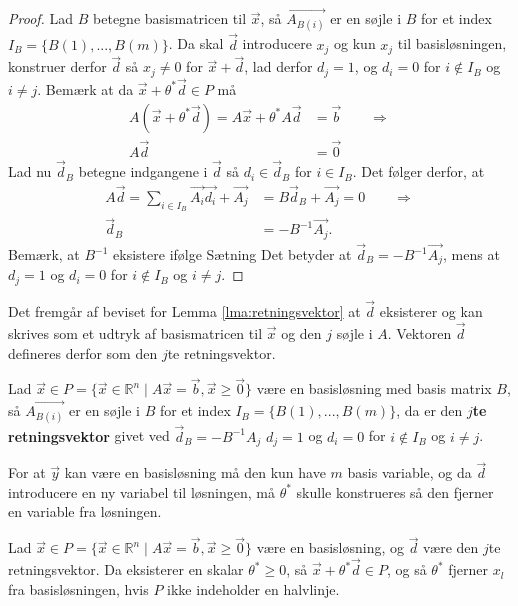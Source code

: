 \begin{proof}
Lad $B$ betegne basismatricen til $\vec{x}$, så $\vec{A_{B(i)}}$ er en søjle i $B$ for et index $I_B =\{B(1),...,B(m)\}$. 
Da skal $\vec{d}$ introducere $x_j$ og kun $x_j$ til basisløsningen, konstruer derfor $\vec{d}$ så $x_j \neq 0$ for $\vec{x}+\vec{d}$, lad derfor $d_j=1$, og $d_i = 0$ for $i\notin I_B$ og $i \neq j$. 
Bemærk at da $\vec{x}+ \theta^*\vec{d} \in P$ må
\begin{align*}
	A(\vec{x}+\theta^* \vec{d}) = A\vec{x} + \theta^* A \vec{d}  & = \vec{b} \qquad \Rightarrow
	\\ A \vec{d} &= \vec{0}
\end{align*}
Lad nu $\vec{d}_B$ betegne indgangene i $\vec{d}$ så $d_i \in \vec{d}_B$ for $i \in I_B$. 
Det følger derfor, at
\begin{align*}
A \vec{d} = \sum_{i \in I_B} \vec{A_i} \vec{d_i} + \vec{A_j} &= B\vec{d}_B + \vec{A_j} = 0 \qquad \Rightarrow
\\ \vec{d}_B &= -B^{-1}\vec{A_j}.
\end{align*}
Bemærk, at $B^{-1}$ eksistere ifølge Sætning %
Det betyder at $\vec{d}_B = -B^{-1}\vec{A_j}$, mens at $d_j = 1$ og $d_i = 0$ for $i\notin I_B$ og $i \neq j$.
\end{proof}
Det fremgår af beviset for Lemma \ref{lma:retningsvektor} at $\vec{d}$ eksisterer og kan skrives som et udtryk af basismatricen til $\vec{x}$ og den $j$ søjle i $A$. 
Vektoren $\vec{d}$ defineres derfor som den $j$te retningsvektor. 
\begin{defn}[$j$te retningsvektor]
Lad $\vec{x} \in P =\{\vec{x}\in \mathds{R}^n \mid A\vec{x}= \vec{b}, \vec{x}\geq \vec{0}\}$ være en basisløsning med basis matrix $B$, så $\vec{A_{B(i)}}$ er en søjle i $B$ for et index $I_B =\{B(1),...,B(m)\}$, da er den \textbf{$j$te retningsvektor} givet ved $\vec{d}_B = - B^{-1} A_j$ $d_j = 1$ og $d_i = 0$ for $i\notin I_B$ og $i \neq j$.
\end{defn}
For at $\vec{y}$ kan være en basisløsning må den kun have $m$ basis variable, og da $\vec{d}$ introducere en ny variabel til løsningen, må $\theta^*$ skulle konstrueres så den fjerner en variable fra løsningen.
\begin{lma}
Lad $\vec{x} \in P =\{\vec{x}\in \mathds{R}^n \mid A\vec{x}= \vec{b}, \vec{x}\geq \vec{0}\}$ være en basisløsning, og $\vec{d}$ være den $j$te retningsvektor.
Da eksisterer en skalar $\theta^* \geq 0$, så $\vec{x} + \theta^* \vec{d} \in P$, og så $\theta^* $ fjerner $x_l$ fra basisløsningen, hvis $P$ ikke indeholder en halvlinje.
\label{lma:skalar}
\end{lma}
